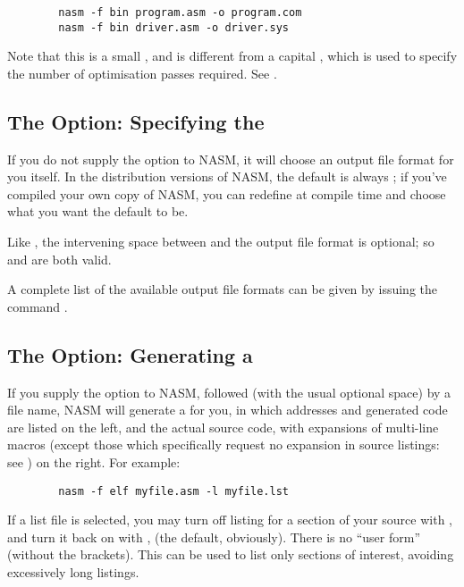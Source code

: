 \begin{lstlisting}
        nasm -f bin program.asm -o program.com
        nasm -f bin driver.asm -o driver.sys
\end{lstlisting}

Note that this is a small , and is different from a capital
, which is used to specify the number of optimisation passes
required. See .

\subsection{The  Option: Specifying the }
\label{subsec:opt-f}

If you do not supply the  option to NASM, it will choose an
output file format for you itself. In the distribution versions of
NASM, the default is always ; if you've compiled
your own copy of NASM, you can redefine 
at compile time and choose what you want the default to be.

Like , the intervening space between  and the output
file format is optional; so  and  are both valid.

A complete list of the available output file formats can be given by
issuing the command .

\subsection{The  Option: Generating a }
\label{subsec:opt-l}

If you supply the  option to NASM, followed (with the usual
optional space) by a file name, NASM will generate a 
for you, in which addresses and generated code are listed on the left, and the
actual source code, with expansions of multi-line macros (except those which
specifically request no expansion in source listings: see )
on the right. For example:

\begin{lstlisting}
        nasm -f elf myfile.asm -l myfile.lst
\end{lstlisting}

If a list file is selected, you may turn off listing for a section of your
source with \code{[list -]}, and turn it back on with \code{[list +]},
(the default, obviously). There is no ``user form'' (without the brackets).
This can be used to list only sections of interest, avoiding excessively
long listings.


